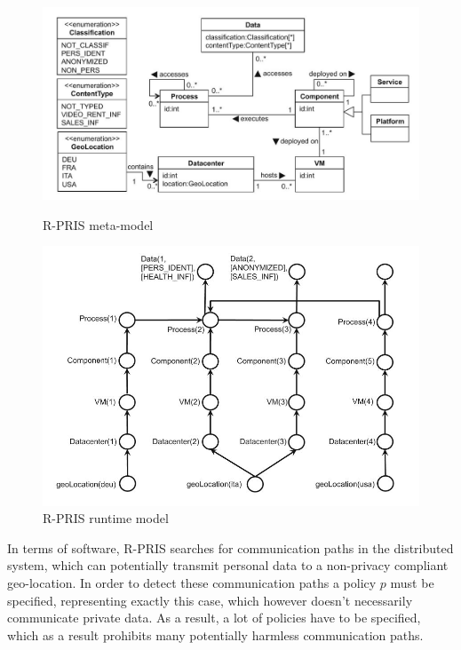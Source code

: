 \begin{figure}[h]
	\centering
	\begin{minipage}[b]{0.48\textwidth}		\includegraphics[width=\textwidth]{pictures/rpris_metamodel.jpg}
		\caption{R-PRIS meta-model}
		\label{fig:rpris_metamodel}
	\end{minipage}
	\begin{minipage}[b]{0.48\textwidth}
		\includegraphics[width=\textwidth]{pictures/rpris_model.jpg}
		\caption{R-PRIS runtime model}
		\label{fig:rpris_model}
	\end{minipage}
\end{figure}

In terms of software, R-PRIS searches for communication paths in the distributed system, which can potentially transmit personal data to a non-privacy compliant geo-location. In order to detect these communication paths a policy $p$ must be specified, representing exactly this case, which however doesn't necessarily communicate private data. As a result, a lot of policies have to be specified, which as a result prohibits many potentially harmless communication paths.

